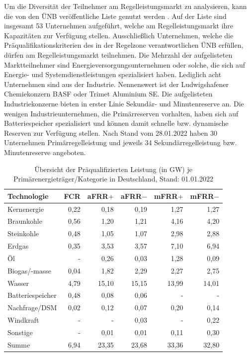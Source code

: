 			Um die Diversität der Teilnehmer am Regelleistungsmarkt zu analysieren, kann die von den ÜNB veröffentliche Liste genutzt werden \cite{regelleistungnet_PRL_Ausschreibung}.
			Auf der Liste sind insgesamt \num{53} Unternehmen aufgeführt, welche am Regelleistungsmarkt ihre Kapazitäten zur Verfügung stellen.
			Ausschließlich Unternehmen, welche die Präqualifikationskriterien des in der Regelzone verantwortlichen ÜNB erfüllen, dürfen am Regelleistungsmarkt teilnehmen.
			Die Mehrzahl der aufgelisteten Marktteilnehmer sind Energieversorgungsunternehmen oder solche, die sich auf Energie- und Systemdienstleistungen spezialisiert haben.
			Lediglich acht Unternehmen sind aus der Industrie.
			Nennenswert ist der Ludwigshafener Chemiekonzern BASF oder Trimet Aluminium SE.
			Die aufgelisteten Industriekonzerne bieten in erster Linie Sekundär- und Minutenreserve an.
			Die wenigen Industrieunternehmen, die Primärreserven vorhalten, haben sich auf Batteriespeicher spezialisiert und können damit schnelle bzw. dynamische Reserven zur Verfügung stellen.
			Nach Stand vom 28.01.2022 haben 30 Unternehmen Primärregelleistung und jeweils 34 Sekundärregelleistung bzw. Minutenreserve angeboten. 
						
			\begin{table}[H]
				\renewcommand*{\arraystretch}{1.3} %
				\centering
				\caption{Übersicht der Präqualifizierten Leistung (in \si{\giga\watt}) je Primärenergieträger/Kategorie in Deutschland, Stand: 01.01.2022 \cite{regelleistungnet_PRL_Ausschreibung}}
				\label{Tab. Übersicht der Präqualifizierten Leistung je PrimärenergieträgerKategorie in Deutschland}
				\begin{tabular}{lrrrrr}
					\hline
					Technologie & FCR  & aFRR$+$ & aFRR$-$& mFRR$+$ & mFRR$-$ \\ \hline
					Kernenergie & 0,22 & 0,18 & 0,19 & 1,27 & 1,27 \\
					Braunkohle & 0,56 & 1,20 & 1,21 & 4,16 & 4,20 \\
					Steinkohle & 0,48 & 1,05 & 1,07 & 2,98 & 2,88 \\
					Erdgas & 0,35 & 3,53 & 3,57 & 7,10 & 6,94 \\
					Öl & - & 0,26 & 0,03 & 1,28 & 0,09 \\
					Biogas/-masse & 0,04 & 1,82 & 2,29 & 2,27 & 2,75 \\
					Wasser & 4,79 & 15,10 & 15,15 & 13,99 & 14,01 \\
					Batteriespeicher & 0,48 & 0,08 & 0,06 & - & - \\
					Nachfrage/DSM & 0,02 & 0,12 & 0,07 & 0,20 & 0,14 \\
					Windkraft & - & - & 0,03 & - & 0,22 \\
					Sonstige & - & 0,01 & 0,01 & 0,11 & 0,30 \\ \hline
					Summe & 6,94 & 23,35 & 23,68 & 33,36 & 32,80
				\end{tabular}
				\renewcommand*{\arraystretch}{1.3} %
			\end{table}
			\renewcommand*{\arraystretch}{1.3} %
			

